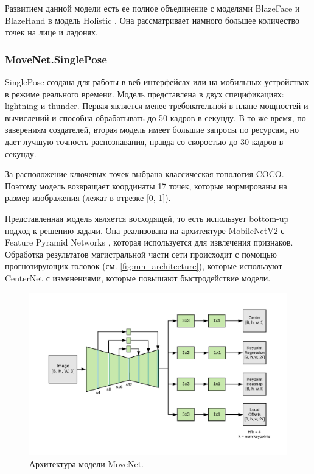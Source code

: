 Развитием данной модели есть ее полное объединение с моделями BlazeFace и BlazeHand в модель Holistic \cite{Holistic}. Она рассматривает намного большее количество точек на лице и ладонях.



\subsubsection{MoveNet.SinglePose}
\label{subsubsec:movenet_desc}

SinglePose создана для работы в веб-интерфейсах или на мобильных устройствах в режиме реального времени. \cite{MoveNet} Модель представлена в двух спецификациях: lightning и thunder. Первая является менее требовательной в плане мощностей и вычислений и способна обрабатывать до 50 кадров в секунду. В то же время, по заверениям создателей, вторая модель имеет большие запросы по ресурсам, но дает лучшую точность распознавания, правда со скоростью до 30 кадров в секунду.

За расположение ключевых точек выбрана классическая топология COCO. Поэтому модель возвращает координаты 17 точек, которые нормированы на размер изображения (лежат в отрезке [0, 1]).

Представленная модель является восходящей, то есть использует bottom-up подход к решению задачи. Она реализована на архитектуре MobileNetV2 \cite{mobilenetv2} с Feature Pyramid Networks \cite{feature_piramid}, которая используется для извлечения признаков. Обработка результатов магистральной части сети происходит с помощью прогнозирующих головок (см. \autoref{fig:mn_architecture}), которые используют CenterNet \cite{CenterNet} с изменениями, которые повышают быстродействие модели.

\begin{figure}[t]
	\centering
	\includegraphics[width=\textwidth * 4 / 5]{./images/MoveNet/architecture}
	\caption{Архитектура модели MoveNet. \cite{MoveNet}}
	\label{fig:mn_architecture}
\end{figure}

